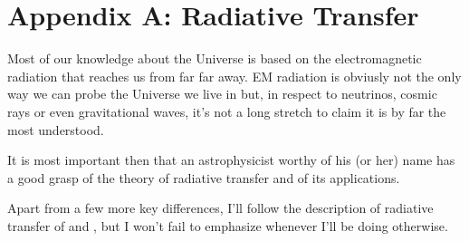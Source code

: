\chapter{Appendix A: Radiative Transfer}

Most of our knowledge about the Universe is based on the electromagnetic radiation that reaches us from far far away. EM radiation is obviusly not the only way we can probe the Universe we live in but, in respect to neutrinos, cosmic rays or even gravitational waves, it's not a long stretch to claim it is by far the most understood.
\par It is most important then that an astrophysicist worthy of his (or her) name has a good grasp of the theory of radiative transfer and of its applications.
\par Apart from a few more key differences, I'll follow the description of radiative transfer of \cite{choudhuri} and \cite{1986rpa..book.....R}, but I won't fail to emphasize whenever I'll be doing otherwise.

